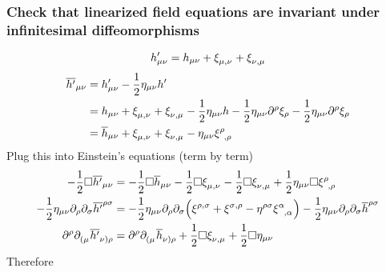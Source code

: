 \subsubsection{Check that linearized field equations are invariant under infinitesimal diffeomorphisms}
\begin{equation}
    h'_{\mu\nu} = h_{\mu\nu} + \tensor{\xi}{_\mu_,_\nu} + \tensor{\xi}{_\nu_,_\mu}
\end{equation}
\begin{equation}
    \begin{split}
        \overline{h'}_{\mu\nu} &= h'_{\mu\nu} - \frac{1}{2} \eta_{\mu\nu}h' \\
        &= h_{\mu\nu} + \tensor{\xi}{_\mu_,_\nu} + \tensor{\xi}{_\nu_,_\mu} - \frac{1}{2} \eta_{\mu\nu}h
        -\frac{1}{2}\eta_{\mu\nu}\partial^\rho\xi_\rho - \frac{1}{2} \eta_{\mu\nu}\partial^\rho\xi_\rho \\
        &= \overline{h}_{\mu\nu} + \tensor{\xi}{_\mu_,_\nu} + \tensor{\xi}{_\nu_,_\mu} - \eta_{\mu\nu}\tensor{\xi}{^\rho_,_\rho}
    \end{split}
\end{equation}
Plug this into Einstein's equations (term by term)
\begin{align}
    -\frac{1}{2}\Box \overline{h'}_{\mu\nu} &= -\frac{1}{2}\Box\overline{h}_{\mu\nu} - \frac{1}{2}\Box\tensor{\xi}{_\mu_,_\nu}
    -\frac{1}{2}\Box\tensor{\xi}{_\nu_,_\mu} + \frac{1}{2} \eta_{\mu\nu}\Box\tensor{\xi}{^\rho_,_\rho} \\
    -\frac{1}{2} \eta_{\mu\nu}\partial_\rho\partial_\sigma \overline{h'}^{\rho\sigma} &=
    -\frac{1}{2} \eta_{\mu\nu}\partial_\rho\partial_\sigma \left( \tensor{\xi}{^\rho^,^\sigma} + \tensor{\xi}{^\sigma^,^\rho}
    - \eta^{\rho\sigma} \tensor{\xi}{^\alpha_,_\alpha} \right) - \frac{1}{2} \eta_{\mu\nu}\partial_\rho\partial_\sigma \overline{h}^{\rho\sigma} \\
    \partial^\rho \tensor{\partial}{_(_\mu} \tensor{\overline{h'}}{_\nu_)_\rho} &=
    \partial^\rho \tensor{\partial}{_(_\mu} \tensor{\overline{h}}{_\nu_)_\rho} + \frac{1}{2}\Box\tensor{\xi}{_\nu_,_\mu}
    + \frac{1}{2}\Box\eta_{\mu\nu}
\end{align}
Therefore
